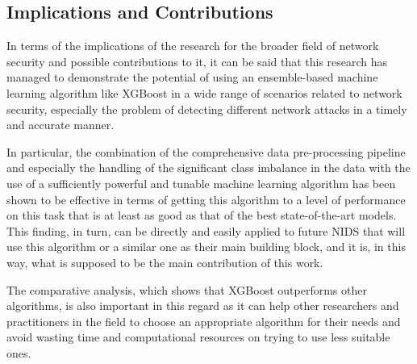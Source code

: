 \subsection{Implications and Contributions}

In terms of the implications of the research for the broader field of network security and possible contributions to it, it can be said that this research has managed to demonstrate the potential of using an ensemble-based machine learning algorithm like XGBoost in a wide range of scenarios related to network security, especially the problem of detecting different network attacks in a timely and accurate manner.

In particular, the combination of the comprehensive data pre-processing pipeline and especially the handling of the significant class imbalance in the data with the use of a sufficiently powerful and tunable machine learning algorithm has been shown to be effective in terms of getting this algorithm to a level of performance on this task that is at least as good as that of the best state-of-the-art models. This finding, in turn, can be directly and easily applied to future NIDS that will use this algorithm or a similar one as their main building block, and it is, in this way, what is supposed to be the main contribution of this work.

The comparative analysis, which shows that XGBoost outperforms other algorithms, is also important in this regard as it can help other researchers and practitioners in the field to choose an appropriate algorithm for their needs and avoid wasting time and computational resources on trying to use less suitable ones.
